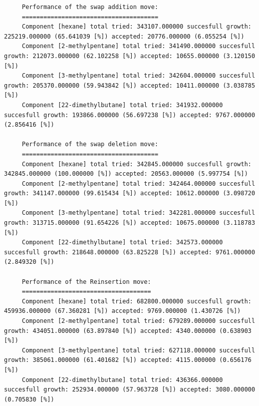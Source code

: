 \begin{tiny}
\begin{verbatim}
     Performance of the swap addition move:
     ======================================
     Component [hexane] total tried: 343107.000000 succesfull growth: 225219.000000 (65.641039 [%]) accepted: 20776.000000 (6.055254 [%])
     Component [2-methylpentane] total tried: 341490.000000 succesfull growth: 212073.000000 (62.102258 [%]) accepted: 10655.000000 (3.120150 [%])
     Component [3-methylpentane] total tried: 342604.000000 succesfull growth: 205370.000000 (59.943842 [%]) accepted: 10411.000000 (3.038785 [%])
     Component [22-dimethylbutane] total tried: 341932.000000 succesfull growth: 193866.000000 (56.697238 [%]) accepted: 9767.000000 (2.856416 [%])
     
     Performance of the swap deletion move:
     ======================================
     Component [hexane] total tried: 342845.000000 succesfull growth: 342845.000000 (100.000000 [%]) accepted: 20563.000000 (5.997754 [%])
     Component [2-methylpentane] total tried: 342464.000000 succesfull growth: 341147.000000 (99.615434 [%]) accepted: 10612.000000 (3.098720 [%])
     Component [3-methylpentane] total tried: 342281.000000 succesfull growth: 313715.000000 (91.654226 [%]) accepted: 10675.000000 (3.118783 [%])
     Component [22-dimethylbutane] total tried: 342573.000000 succesfull growth: 218648.000000 (63.825228 [%]) accepted: 9761.000000 (2.849320 [%])
     
     Performance of the Reinsertion move:
     ====================================
     Component [hexane] total tried: 682800.000000 succesfull growth: 459936.000000 (67.360281 [%]) accepted: 9769.000000 (1.430726 [%])
     Component [2-methylpentane] total tried: 679289.000000 succesfull growth: 434051.000000 (63.897840 [%]) accepted: 4340.000000 (0.638903 [%])
     Component [3-methylpentane] total tried: 627118.000000 succesfull growth: 385061.000000 (61.401682 [%]) accepted: 4115.000000 (0.656176 [%])
     Component [22-dimethylbutane] total tried: 436366.000000 succesfull growth: 252934.000000 (57.963728 [%]) accepted: 3080.000000 (0.705830 [%])
\end{verbatim}
\end{tiny}

